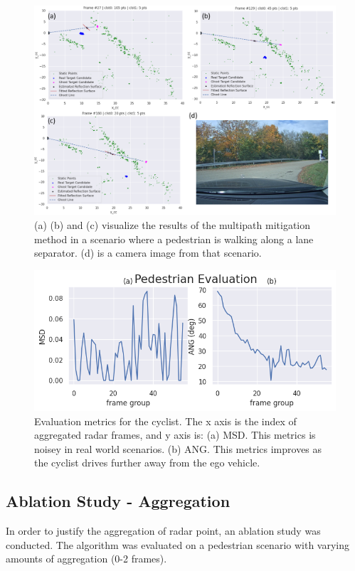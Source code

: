 \documentclass[../main.tex]{subfiles}
\begin{document}
\begin{figure}[htbp]
    \centerline{\includegraphics[scale=0.33]{figures/fig_ped.png}}
    \caption{(a) (b) and (c) visualize the results of the multipath mitigation method in a scenario where a pedestrian is walking along a lane separator. (d) is a camera image from that scenario.}
    \label{fig:ped}
\end{figure}

\begin{figure}[htbp]
    \centerline{\includegraphics[scale=0.33]{figures/fig_ped_metrics.png}}
    \caption{Evaluation metrics for the cyclist. The x axis is the index of aggregated radar frames, and y axis is: (a) MSD. This metrics is noisey in real world scenarios. (b) ANG. This metrics improves as the cyclist drives further away from the ego vehicle.}
    \label{fig:ped_metrics}
\end{figure}

\subsection*{Ablation Study - Aggregation}
In order to justify the aggregation of radar point, an ablation study was conducted. The algorithm was evaluated on a pedestrian scenario with varying amounts of aggregation (0-2 frames).
\end{document}

